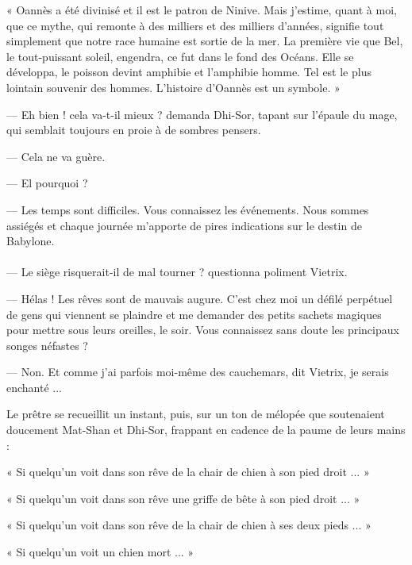 \documentclass[a4paper, 11pt, oneside, polutonikogreek, french]{article}
\begin{document}
« Oannès a été divinisé et il est le patron de Ninive. Mais j'estime, quant à moi, que ce mythe, qui remonte à des milliers et des milliers d'années, signifie tout simplement que notre race humaine est sortie de la mer. La première vie que Bel, le tout-puissant soleil, engendra, ce fut dans le fond des Océans. Elle se développa, le poisson devint amphibie et l'amphibie homme. Tel est le plus lointain souvenir des hommes. L'histoire d'Oannès est un symbole. »

\bigskip
\centerline{\EightStarTaper}
\centerline{\EightStarTaper\EightStarTaper}
\bigskip

--- Eh bien ! cela va-t-il mieux ? demanda Dhi-Sor, tapant sur l'épaule du mage, qui semblait toujours en proie à de sombres pensers.

--- Cela ne va guère.

--- El pourquoi ?

--- Les temps sont difficiles. Vous connaissez les événements. Nous sommes assiégés et chaque journée m'apporte de pires indications sur le destin de Babylone.
\clearpage
\paragraph{}
--- Le siège risquerait-il de mal tourner ? questionna poliment Vietrix.

--- Hélas ! Les rêves sont de mauvais augure. C'est chez moi un défilé perpétuel de gens qui viennent se plaindre et me demander des petits sachets magiques pour mettre sous leurs oreilles, le soir. Vous connaissez sans doute les principaux songes néfastes ?

--- Non. Et comme j'ai parfois moi-même des cauchemars, dit Vietrix, je serais enchanté ...

\bigskip
\centerline{\EightStarTaper}
\centerline{\EightStarTaper\EightStarTaper}
\bigskip

Le prêtre se recueillit un instant, puis, sur un ton de mélopée que soutenaient doucement Mat-Shan et Dhi-Sor, frappant en cadence de la paume de leurs mains :

« Si quelqu'un voit dans son rêve de la chair de chien à son pied droit ... »

« Si quelqu'un voit dans son rêve une griffe de bête à son pied droit ... »

« Si quelqu'un voit dans son rêve de la chair de chien à ses deux pieds ... »

« Si quelqu'un voit un chien mort ... »
\end{document}
